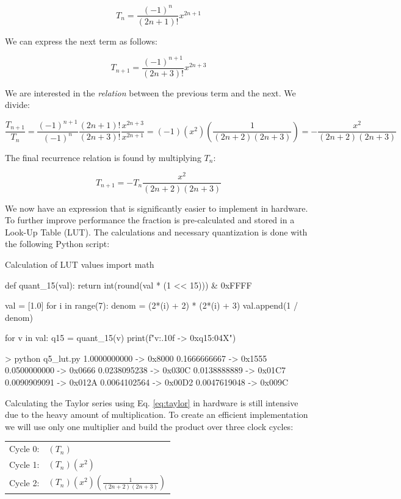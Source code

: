 \documentclass[../main.tex]{subfiles}
\begin{document}
$$
T_n = \frac{(-1)^n}{(2n + 1)!} x^{2n + 1}
$$

We can express the next term as follows:

$$
T_{n+1} = \frac{(-1)^{n+1}}{(2n + 3)!} x^{2n + 3}
$$

We are interested in the \textit{relation} between the previous term and the next. We divide:

$$
\frac{T_{n+1}}{T_n} = \frac{(-1)^{n+1}}{(-1)^n} \frac{(2n +1)!}{(2n + 3)!} \frac{x^{2n + 3}}{x^{2n + 1}} = (-1) (x^2) \left( \frac{1}{(2n + 2)(2n + 3)} \right) = - \frac{x^2}{(2n + 2)(2n + 3)}
$$

The final recurrence relation is found by multiplying $T_n$:

\begin{equation}
    T_{n + 1} = - T_n \frac{x^2}{(2n + 2)(2n + 3)}
\end{equation} \label{eq:taylor}


We now have an expression that is significantly easier to implement in hardware. To further improve performance the fraction is pre-calculated and stored in a Look-Up Table (LUT). The calculations and necessary quantization is done with the following Python script:

\begin{svpython}{Calculation of LUT values}
import math

def quant_15(val):
    return int(round(val * (1 << 15))) & 0xFFFF

val = [1.0]
for i in range(7):
    denom = (2*(i) + 2) * (2*(i) + 3)
    val.append(1 / denom)

for v in val:
    q15 = quant_15(v)
    print(f"{v:.10f} -> 0x{q15:04X}")
\end{svpython}

\begin{textcode}{> python q5\_lut.py}
1.0000000000 -> 0x8000
0.1666666667 -> 0x1555
0.0500000000 -> 0x0666
0.0238095238 -> 0x030C
0.0138888889 -> 0x01C7
0.0090909091 -> 0x012A
0.0064102564 -> 0x00D2
0.0047619048 -> 0x009C
\end{textcode}

Calculating the Taylor series using Eq. \ref{eq:taylor} in hardware is still intensive due to the heavy amount of multiplication. To create an efficient implementation we will use only one multiplier and build the product over three clock cycles:

\begin{table}[h]
    \centering
    \renewcommand{\arraystretch}{1.5}
    \begin{tabular}{l l}
        Cycle 0: & $(T_n)$ \\
        Cycle 1: & $(T_n) (x^2)$ \\
        Cycle 2: & $(T_n) (x^2) \left(\frac{1}{(2n + 2)(2n + 3)}\right)$
    \end{tabular}
\end{table}
\end{document}
